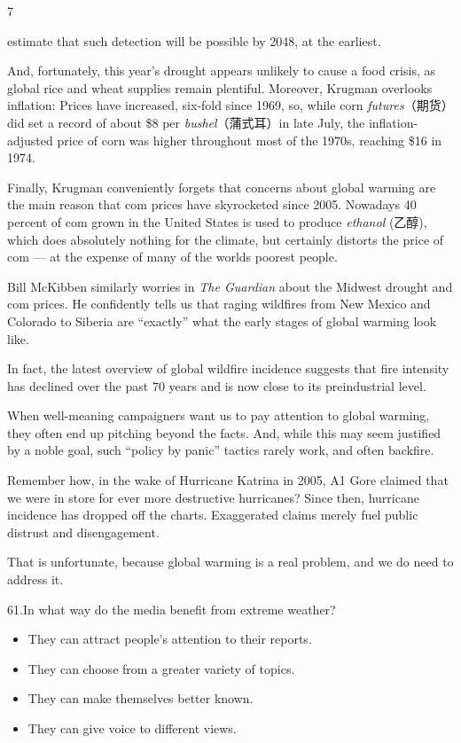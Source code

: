 \documentclass[UTF8,11pt]{ctexart}
\begin{document}
7


estimate that such detection will be possible by 2048, at the earliest.


And, fortunately, this year’s drought appears unlikely to cause a food crisis, as global rice and wheat supplies remain plentiful. Moreover, Krugman overlooks inflation: Prices have increased, six-fold since 1969, so, while corn\textit{ futures}（期货） did set a record of about \$8 per\textit{ bushel}（蒲式耳）in late July, the inflation-adjusted price of corn was higher throughout most of the 1970s, reaching \$16 in 1974.


Finally, Krugman conveniently forgets that concerns about global warming are the main reason that com prices have skyrocketed since 2005. Nowadays 40 percent of com grown in the United States is used to produce\textit{ ethanol} (乙醇), which does absolutely nothing for the climate, but certainly distorts the price of com — at the expense of many of the worlds poorest people.


Bill McKibben similarly worries in\textit{ The Guardian} about the Midwest drought and com prices. He confidently tells us that raging wildfires from New Mexico and Colorado to Siberia are “exactly” what the early stages of global warming look like.


In fact, the latest overview of global wildfire incidence suggests that fire intensity has declined over the past 70 years and is now close to its preindustrial level.


When well-meaning campaigners want us to pay attention to global warming, they often end up pitching beyond the facts. And, while this may seem justified by a noble goal, such “policy by panic” tactics rarely work, and often backfire.


Remember how, in the wake of Hurricane Katrina in 2005, A1 Gore claimed that we were in store for ever more destructive hurricanes? Since then, hurricane incidence has dropped off the charts. Exaggerated claims merely fuel public distrust and disengagement.


That is unfortunate, because global warming is a real problem, and we do need to address it.


61.In what way do the media benefit from extreme weather?


\begin{itemize}[leftmargin=2em,itemsep=.2em,topsep=.4em]\item[A.] They can attract people’s attention to their reports.
\item[B.] They can choose from a greater variety of topics.
\item[C.] They can make themselves better known.
\item[D.] They can give voice to different views.
\end{itemize}
\end{document}
